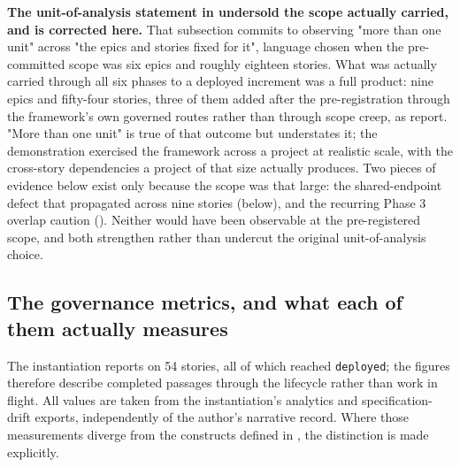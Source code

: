 \textbf{The unit-of-analysis statement in  undersold the scope actually carried, and is corrected here.} That subsection commits to observing "more than one unit" across "the epics and stories fixed for it", language chosen when the pre-committed scope was six epics and roughly eighteen stories. What was actually carried through all six phases to a deployed increment was a full product: nine epics and fifty-four stories, three of them added after the pre-registration through the framework's own governed routes rather than through scope creep, as  report. "More than one unit" is true of that outcome but understates it; the demonstration exercised the framework across a project at realistic scale, with the cross-story dependencies a project of that size actually produces. Two pieces of evidence below exist only because the scope was that large: the shared-endpoint defect that propagated across nine stories (below), and the recurring Phase 3 overlap caution (). Neither would have been observable at the pre-registered scope, and both strengthen rather than undercut the original unit-of-analysis choice.

\subsection*{The governance metrics, and what each of them actually measures}

The instantiation reports on 54 stories, all of which reached \texttt{deployed}; the figures therefore describe completed passages through the lifecycle rather than work in flight. All values are taken from the instantiation's analytics and specification-drift exports, independently of the author's narrative record. Where those measurements diverge from the constructs defined in , the distinction is made explicitly.


